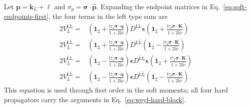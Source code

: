 \documentclass[a4paper,12pt]{article}
\newcommand{\ii}{\mathrm i}
\newcommand{\mb}{\mathbf}
\newcommand{\tn}{\tilde\nu}
\newcommand{\bq}{\mb q}
\newcommand{\bs}{\bm\sigma}
\newcommand{\one}{\mathbf1_2}
\newcommand{\epsmat}{\boldsymbol{\epsilon}}
\begin{document}
Let $\mb p=\mb k_L+\bm\ell$ and $\sigma_p=\bs\cdot\widehat{\mb p}$.
Expanding the endpoint matrices in Eq.~\eqref{eq:soft-endpoints-first},
the four terms in the left type sum are
\begin{align}
 2V_L^{\mathrm L\mathrm L}={}&
 \left(\one+\frac{\ii\tau_1\bs\cdot\bq}{1+2\ii\tn}\right)
 D^{\mathrm L\mathrm L}\epsmat
 \left(\one+\frac{\ii\tau_2\bs\cdot\mb K}{1+2\ii\tn}\right)
 \nonumber\\
 2V_L^{\mathrm L\overline{\mathrm L}}={}&
 \left(\one+\frac{\ii\tau_1\bs\cdot\bq}{1+2\ii\tn}\right)
 D^{\mathrm L\overline{\mathrm L}}
 \left(\one-\frac{\ii\tau_2\bs\cdot\mb K}{1+2\ii\tn}\right)
 \nonumber\\
 2V_L^{\overline{\mathrm L}\mathrm L}={}&
 \left(\one-\frac{\ii\tau_1\bs\cdot\bq}{1+2\ii\tn}\right)\epsmat
 D^{\overline{\mathrm L}\mathrm L}\epsmat
 \left(\one+\frac{\ii\tau_2\bs\cdot\mb K}{1+2\ii\tn}\right)
 \nonumber\\
 2V_L^{\overline{\mathrm L}\overline{\mathrm L}}={}&
 \left(\one-\frac{\ii\tau_1\bs\cdot\bq}{1+2\ii\tn}\right)\epsmat
 D^{\overline{\mathrm L}\overline{\mathrm L}}
 \left(\one-\frac{\ii\tau_2\bs\cdot\mb K}{1+2\ii\tn}\right).
 \label{eq:hard-four-types}
\end{align}
This equation is used through first order in the soft momenta;
all four hard propagators carry the arguments in
Eq.~\eqref{eq:weyl-hard-block}.
\end{document}
